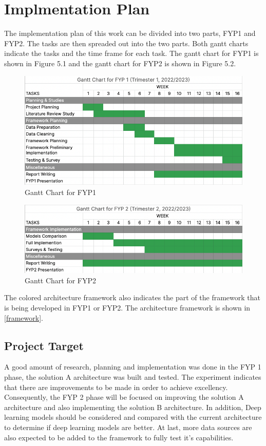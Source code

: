 \chapter{Implmentation Plan}
The implementation plan of this work can be divided into two parts, FYP1 and FYP2. The tasks are then spreaded out into the two parts. Both gantt charts indicate the tasks and the time frame for each task. The gantt chart for FYP1 is shown in Figure 5.1 and the gantt chart for FYP2 is shown in Figure 5.2.

\begin{figure}[H]
  \centering
  \includegraphics[scale=0.60]{assets/gc-1.png}
  \caption{Gantt Chart for FYP1}
  \label{fig:gc-1}
\end{figure}

\begin{figure}[H]
  \centering
  \includegraphics[scale=0.60]{assets/gc-2.png}
  \caption{Gantt Chart for FYP2}
  \label{fig:gc-2}
\end{figure}


\noindent The colored architecture framework also indicates the part of the framework that is being developed in FYP1 or FYP2. The architecture framework is shown in \ref{framework}.

\section{Project Target}
A good amount of research, planning and implementation was done in the FYP 1 phase, the solution A architecture was built and tested. The experiment indicates that there are improvements to be made in order to achieve excellency. Consequently, the FYP 2 phase will be focused on improving the solution A architecture and also implementing the solution B architecture. In addition, Deep learning models should be considered and compared with the current architecture to determine if deep learning models are better. At last, more data sources are also expected to be added to the framework to fully test it's capabilities.

